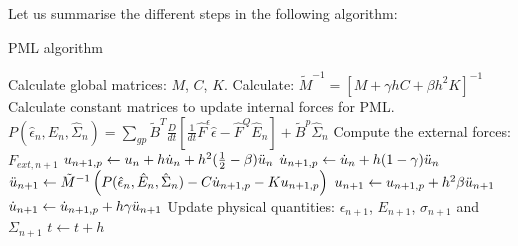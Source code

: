 Let us summarise the different steps in the following algorithm:
\begin{algorithm}
\caption{PML algorithm}
\begin{algorithmic} 
\REQUIRE Calculate global matrices: $M$, $C$, $K$.
\REQUIRE Calculate: $\tilde{M}^{-1} = \left[ M+ \gamma h C +\beta h^2 K  \right]^{-1}$
\REQUIRE Calculate constant matrices to update internal forces for PML.
\STATE $P(\hat{\epsilon}_n,\hat{E}_n,\hat{\Sigma}_n) = \sum_{gp} \tilde{B}^T \frac{D}{dt} \left[\frac{1}{dt}\hat{F}^{\epsilon} \hat{\epsilon} - \hat{F}^Q \hat{E}_n \right] + \tilde{B}^p \hat{\Sigma}_n $
\ENDFOR
\STATE Compute the external forces: $F_{ext,n+1}$
\STATE $u_{n+1,p} \leftarrow u_n + h \Dot{u}_n + h^2(\frac{1}{2}-\beta)\Ddot{u}_n$
\STATE $\dot{u}_{n+1,p} \leftarrow \dot{u}_n + h (1-\gamma)\Ddot{u}_n$
\STATE $\Ddot{u}_{n+1} \leftarrow \tilde{M}^{-1} \left( P(\hat{\epsilon}_n,\hat{E}_n,\hat{\Sigma}_n) - C \dot{u}_{n+1,p} - K u_{n+1,p}\right)$
\STATE $u_{n+1} \leftarrow u_{n+1,p} + h^2 \beta \Ddot{u}_{n+1}$
\STATE $\dot{u}_{n+1} \leftarrow \dot{u}_{n+1,p}+ h \gamma \Ddot{u}_{n+1}$
\STATE Update physical quantities: $\epsilon_{n+1}$, $E_{n+1}$, $\sigma_{n+1}$ and $\Sigma_{n+1}$ 
\STATE $t\leftarrow t+h$
\ENDWHILE

\end{algorithmic}
\end{algorithm}


